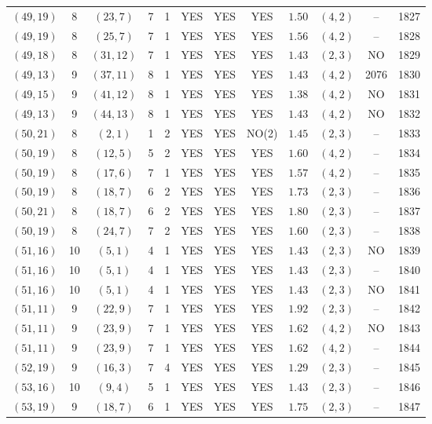 \begin{longtable}{|c|c|c|c|c|c|c|c|c|c|c|c|}
$(49,19)$ & 8 & $(23,7)$ & 7 & 1 & YES & YES & YES & $1.50$ & $(4,2)$ & -- & 1827\\
$(49,19)$ & 8 & $(25,7)$ & 7 & 1 & YES & YES & YES & $1.56$ & $(4,2)$ & -- & 1828\\
$(49,18)$ & 8 & $(31,12)$ & 7 & 1 & YES & YES & YES & $1.43$ & $(2,3)$ & NO & 1829\\
$(49,13)$ & 9 & $(37,11)$ & 8 & 1 & YES & YES & YES & $1.43$ & $(4,2)$ & 2076 & 1830\\
$(49,15)$ & 9 & $(41,12)$ & 8 & 1 & YES & YES & YES & $1.38$ & $(4,2)$ & NO & 1831\\
$(49,13)$ & 9 & $(44,13)$ & 8 & 1 & YES & YES & YES & $1.43$ & $(4,2)$ & NO & 1832\\
$(50,21)$ & 8 & $(2,1)$ & 1 & 2 & YES & YES & NO(2) & $1.45$ & $(2,3)$ & -- & 1833\\
$(50,19)$ & 8 & $(12,5)$ & 5 & 2 & YES & YES & YES & $1.60$ & $(4,2)$ & -- & 1834\\
$(50,19)$ & 8 & $(17,6)$ & 7 & 1 & YES & YES & YES & $1.57$ & $(4,2)$ & -- & 1835\\
$(50,19)$ & 8 & $(18,7)$ & 6 & 2 & YES & YES & YES & $1.73$ & $(2,3)$ & -- & 1836\\
$(50,21)$ & 8 & $(18,7)$ & 6 & 2 & YES & YES & YES & $1.80$ & $(2,3)$ & -- & 1837\\
$(50,19)$ & 8 & $(24,7)$ & 7 & 2 & YES & YES & YES & $1.60$ & $(2,3)$ & -- & 1838\\
$(51,16)$ & 10 & $(5,1)$ & 4 & 1 & YES & YES & YES & $1.43$ & $(2,3)$ & NO & 1839\\
$(51,16)$ & 10 & $(5,1)$ & 4 & 1 & YES & YES & YES & $1.43$ & $(2,3)$ & -- & 1840\\
$(51,16)$ & 10 & $(5,1)$ & 4 & 1 & YES & YES & YES & $1.43$ & $(2,3)$ & NO & 1841\\
$(51,11)$ & 9 & $(22,9)$ & 7 & 1 & YES & YES & YES & $1.92$ & $(2,3)$ & -- & 1842\\
$(51,11)$ & 9 & $(23,9)$ & 7 & 1 & YES & YES & YES & $1.62$ & $(4,2)$ & NO & 1843\\
$(51,11)$ & 9 & $(23,9)$ & 7 & 1 & YES & YES & YES & $1.62$ & $(4,2)$ & -- & 1844\\
$(52,19)$ & 9 & $(16,3)$ & 7 & 4 & YES & YES & YES & $1.29$ & $(2,3)$ & -- & 1845\\
$(53,16)$ & 10 & $(9,4)$ & 5 & 1 & YES & YES & YES & $1.43$ & $(2,3)$ & -- & 1846\\
$(53,19)$ & 9 & $(18,7)$ & 6 & 1 & YES & YES & YES & $1.75$ & $(2,3)$ & -- & 1847\\

\end{longtable}
